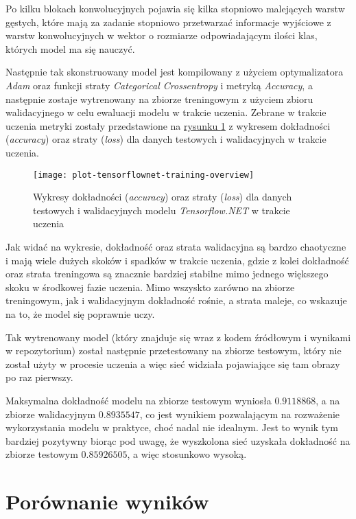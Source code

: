 Po kilku blokach konwolucyjnych pojawia się kilka stopniowo malejących warstw gęstych, które mają za zadanie stopniowo przetwarzać informacje wyjściowe z warstw konwolucyjnych w wektor o rozmiarze odpowiadającym ilości klas, których model ma się nauczyć.

Następnie tak skonstruowany model jest kompilowany z użyciem optymalizatora \emph{Adam} oraz funkcji straty \emph{Categorical Crossentropy} i metryką \emph{Accuracy}, a następnie zostaje wytrenowany na zbiorze treningowym z użyciem zbioru walidacyjnego w celu ewaluacji modelu w trakcie uczenia.
Zebrane w trakcie uczenia metryki zostały przedstawione na \hyperref[fig:plot-tensorflownet-training-overview]{rysunku \ref*{fig:plot-tensorflownet-training-overview}} z wykresem dokładności (\emph{accuracy}) oraz straty (\emph{loss}) dla danych testowych i walidacyjnych w trakcie uczenia.

\begin{figure}[ht]
  \texttt{[image: plot-tensorflownet-training-overview]}
  \caption[Wykresy statystyk modelu Tensorflow.NET w trakcie uczenia]{Wykresy dokładności (\emph{accuracy}) oraz straty (\emph{loss}) dla danych testowych i walidacyjnych modelu \emph{Tensorflow.NET} w trakcie uczenia}
  \label{fig:plot-tensorflownet-training-overview}
\end{figure}

Jak widać na wykresie, dokładność oraz strata walidacyjna są bardzo chaotyczne i mają wiele dużych skoków i spadków w trakcie uczenia, gdzie z kolei dokładność oraz strata treningowa są znacznie bardziej stabilne mimo jednego większego skoku w środkowej fazie uczenia.
Mimo wszyskto zarówno na zbiorze treningowym, jak i walidacyjnym dokładność rośnie, a strata maleje, co wskazuje na to, że model się poprawnie uczy.

Tak wytrenowany model (który znajduje się wraz z kodem źródłowym i wynikami w repozytorium) został następnie przetestowany na zbiorze testowym, który nie został użyty w procesie uczenia a więc sieć widziała pojawiające się tam obrazy po raz pierwszy.

Maksymalna dokładność modelu na zbiorze testowym wyniosła $0.9118868$, a na zbiorze walidacyjnym $0.8935547$, co jest wynikiem pozwalającym na rozważenie wykorzystania modelu w praktyce, choć nadal nie idealnym.
Jest to wynik tym bardziej pozytywny biorąc pod uwagę, że wyszkolona sieć uzyskała dokładność na zbiorze testowym $0.85926505$, a więc stosunkowo wysoką.

\section{Porównanie wyników}

